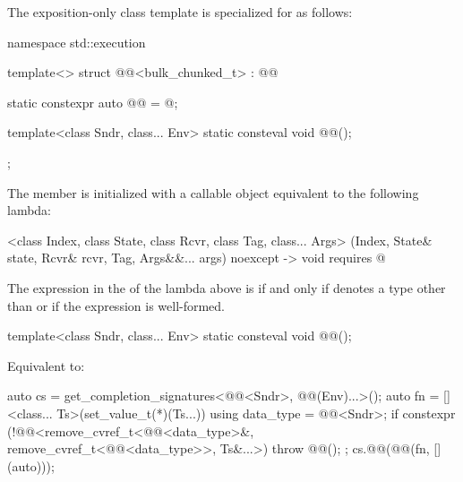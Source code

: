 \pnum
The exposition-only class template 
is specialized for  as follows:
\begin{codeblock}
namespace std::execution {
  template<>
  struct @@<bulk_chunked_t> : @@ {
    static constexpr auto @@ = @\seebelow@;

    template<class Sndr, class... Env>
      static consteval void @@();
  };
}
\end{codeblock}
The member 
is initialized with a callable object equivalent to the following lambda:
\begin{codeblock}
[]<class Index, class State, class Rcvr, class Tag, class... Args>
  (Index, State& state, Rcvr& rcvr, Tag, Args&&... args) noexcept
  -> void requires @
\end{codeblock}
The expression in the  of the lambda above is
 if and only
if  denotes a type other than  or
if the expression  is well-formed.

\begin{itemdecl}
template<class Sndr, class... Env>
  static consteval void @@();
\end{itemdecl}

\begin{itemdescr}
\pnum
\effects
Equivalent to:
\begin{codeblock}
auto cs = get_completion_signatures<@@<Sndr>, @@(Env)...>();
auto fn = []<class... Ts>(set_value_t(*)(Ts...)) {
  using data_type = @@<Sndr>;
  if constexpr (!@@<remove_cvref_t<@@<data_type>&,
                           remove_cvref_t<@@<data_type>>, Ts&...>)
    throw @@();
};
cs.@@(@@(fn, [](auto){}));
\end{codeblock}
\end{itemdescr}

